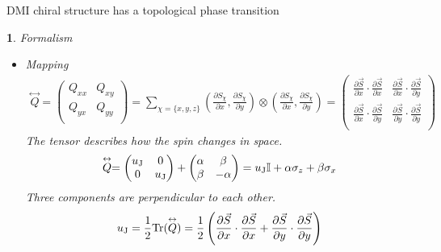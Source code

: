 \documentclass[12pt]{article}
\theoremstyle{problemstyle}
\newtheorem{problem}{}
\begin{document}
\noindent \hfill 

DMI chiral structure has a topological phase transition

\noindent 

\begin{problem} Formalism
    \begin{itemize}
    
        \item Mapping
        \begin{equation}\begin{split}
            \stackrel{\leftrightarrow}{Q} = \begin{pmatrix} 
                Q_{xx} & Q_{xy} \\
                Q_{yx} & Q_{yy} \\
                \end{pmatrix} 
                = \sum_{\chi = \{ x,y,z \} } 
                \left( \frac{\partial S_{\chi}}{\partial x}, \frac{\partial S_{\chi}}{\partial y}\right)\otimes \left( \frac{\partial S_{\chi}}{\partial x}, \frac{\partial S_{\chi}}{\partial y}\right) 
                = 
                \begin{pmatrix} 
                \frac{\partial \vec{S}}{\partial x} \cdot \frac{\partial \vec{S}}{\partial x} & \frac{\partial \vec{S}}{\partial x} \cdot \frac{\partial \vec{S}}{\partial y} \\
                \frac{\partial \vec{S}}{\partial x} \cdot \frac{\partial \vec{S}}{\partial y} & \frac{\partial \vec{S}}{\partial y} \cdot \frac{\partial \vec{S}}{\partial y} \\
                \end{pmatrix}
            \end{split}\end{equation}
        The tensor describes how the spin changes in space.
        \begin{equation}
            \stackrel{\leftrightarrow}{Q} =
                \begin{pmatrix} u_{\rm{J}} & 0 \\ 0 & u_{\rm{J}} \end{pmatrix} + \begin{pmatrix} \alpha & \beta \\ \beta & -\alpha \end{pmatrix}
                = u_{\rm{J}} \mathbb{I} + \alpha \sigma_z + \beta \sigma_x
        \end{equation}
        Three components are perpendicular to each other.
        \begin{equation}
            u_{\rm{J}} = \frac{1}{2} \mathrm{Tr}(\stackrel{\leftrightarrow}Q) = \frac{1}{2} \left( \frac{\partial \vec{S}}{\partial x} \cdot \frac{\partial \vec{S}}{\partial x} 
            + \frac{\partial \vec{S}}{\partial y} \cdot \frac{\partial \vec{S}}{\partial y} \right)
        \end{equation}


\end{itemize}
\end{problem}
\end{document}
